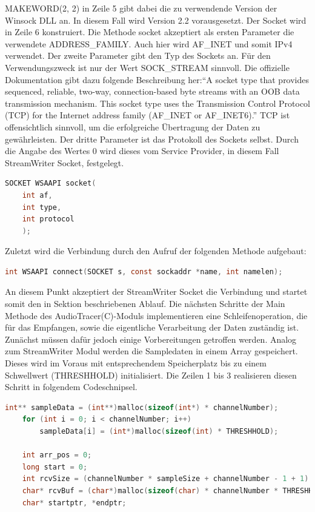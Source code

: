 MAKEWORD(2, 2) in Zeile 5 gibt dabei die zu verwendende Version der Winsock DLL an. In diesem Fall wird Version 2.2 vorausgesetzt. Der Socket wird in Zeile 6 konstruiert. Die Methode socket akzeptiert als ersten Parameter die verwendete ADDRESS\_FAMILY. Auch hier wird AF\_INET und somit IPv4 verwendet. Der zweite Parameter gibt den Typ des Sockets an. Für den Verwendungszweck ist nur der Wert  SOCK\_STREAM sinnvoll. Die offizielle Dokumentation \cite{ms_docs_winsock} gibt dazu folgende Beschreibung her:\enquote{A socket type that provides sequenced, reliable, two-way, connection-based byte streams with an OOB data transmission mechanism. This socket type uses the Transmission Control Protocol (TCP) for the Internet address family (AF\_INET or AF\_INET6).} TCP ist offensichtlich sinnvoll, um die erfolgreiche Übertragung der Daten zu gewährleisten. Der dritte Parameter ist das Protokoll des Sockets selbst. Durch die Angabe des Wertes 0 wird dieses vom Service Provider, in diesem Fall StreamWriter Socket, festgelegt.

\begin{lstlisting}[language=C, frame=none]
	SOCKET WSAAPI socket(
	int af,
	int type,
	int protocol
	);
\end{lstlisting}

Zuletzt wird die Verbindung durch den Aufruf der folgenden Methode aufgebaut:
\begin{lstlisting}[language=C, frame=none]
	int WSAAPI connect(SOCKET s, const sockaddr *name, int namelen);
\end{lstlisting}

An diesem Punkt akzeptiert der StreamWriter Socket die Verbindung und startet somit den in Sektion  beschriebenen Ablauf. Die nächsten Schritte der Main Methode des AudioTracer(C)-Moduls implementieren eine Schleifenoperation, die für das Empfangen, sowie die eigentliche Verarbeitung der Daten zuständig ist. Zunächst müssen dafür jedoch einige Vorbereitungen getroffen werden. Analog zum StreamWriter Modul werden die Sampledaten in einem Array gespeichert. Dieses wird im Voraus mit entsprechendem Speicherplatz bis zu einem Schwellwert (THRESHHOLD) initialisiert. Die Zeilen 1 bis 3 realisieren diesen Schritt in folgendem Codeschnipsel.

\begin{lstlisting}[language=C, frame=none]
	int** sampleData = (int**)malloc(sizeof(int*) * channelNumber);
	for (int i = 0; i < channelNumber; i++)
		sampleData[i] = (int*)malloc(sizeof(int) * THRESHHOLD);
	
	int arr_pos = 0;
	long start = 0;
	int rcvSize = (channelNumber * sampleSize + channelNumber - 1 + 1) * THRESHHOLD;
	char* rcvBuf = (char*)malloc(sizeof(char) * channelNumber * THRESHHOLD);
	char* startptr, *endptr;
\end{lstlisting}

